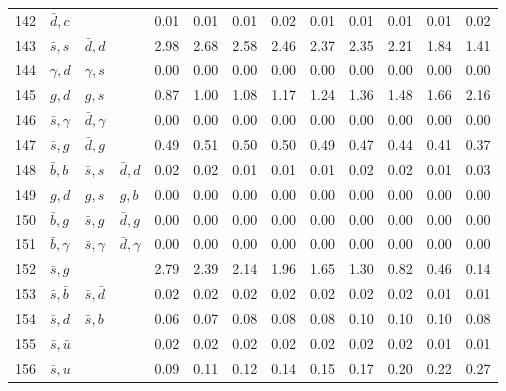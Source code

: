 \begin{tabularx}{\textwidth}{rXXX@{}S@{}S@{}S@{}S@{}S@{}S@{}S@{}S@{}S}
142 & $\bar d, c$      &                   &                  &  0.01 &  0.01 &  0.01 &  0.02 &  0.01 &  0.01 &  0.01 &  0.01 &  0.02 \\
143 & $\bar s, s$      & $\bar d, d$       &                  &  2.98 &  2.68 &  2.58 &  2.46 &  2.37 &  2.35 &  2.21 &  1.84 &  1.41 \\
144 & $\gamma, d$      & $\gamma, s$       &                  &  0.00 &  0.00 &  0.00 &  0.00 &  0.00 &  0.00 &  0.00 &  0.00 &  0.00 \\
145 & $g, d$           & $g, s$            &                  &  0.87 &  1.00 &  1.08 &  1.17 &  1.24 &  1.36 &  1.48 &  1.66 &  2.16 \\
146 & $\bar s, \gamma$ & $\bar d, \gamma$  &                  &  0.00 &  0.00 &  0.00 &  0.00 &  0.00 &  0.00 &  0.00 &  0.00 &  0.00 \\
147 & $\bar s, g$      & $\bar d, g$       &                  &  0.49 &  0.51 &  0.50 &  0.50 &  0.49 &  0.47 &  0.44 &  0.41 &  0.37 \\
148 & $\bar b,  b$     & $\bar s, s$       & $\bar d, d$      &  0.02 &  0.02 &  0.01 &  0.01 &  0.01 &  0.02 &  0.02 &  0.01 &  0.03 \\
149 & $g,  d$          & $g, s$            & $g, b$           &  0.00 &  0.00 &  0.00 &  0.00 &  0.00 &  0.00 &  0.00 &  0.00 &  0.00 \\
150 & $\bar b, g$      & $\bar s, g$       & $\bar d, g$      &  0.00 &  0.00 &  0.00 &  0.00 &  0.00 &  0.00 &  0.00 &  0.00 &  0.00 \\
151 & $\bar b, \gamma$ & $\bar s, \gamma$  & $\bar d, \gamma$ &  0.00 &  0.00 &  0.00 &  0.00 &  0.00 &  0.00 &  0.00 &  0.00 &  0.00 \\
152 & $\bar s, g$      &                   &                  &  2.79 &  2.39 &  2.14 &  1.96 &  1.65 &  1.30 &  0.82 &  0.46 &  0.14 \\
153 & $\bar s, \bar b$ & $\bar s, \bar d$  &                  &  0.02 &  0.02 &  0.02 &  0.02 &  0.02 &  0.02 &  0.02 &  0.01 &  0.01 \\
154 & $\bar s, d$      & $\bar s, b$       &                  &  0.06 &  0.07 &  0.08 &  0.08 &  0.08 &  0.10 &  0.10 &  0.10 &  0.08 \\
155 & $\bar s, \bar u$ &                   &                  &  0.02 &  0.02 &  0.02 &  0.02 &  0.02 &  0.02 &  0.02 &  0.01 &  0.01 \\
156 & $\bar s, u$      &                   &                  &  0.09 &  0.11 &  0.12 &  0.14 &  0.15 &  0.17 &  0.20 &  0.22 &  0.27 \\

\end{tabularx}
